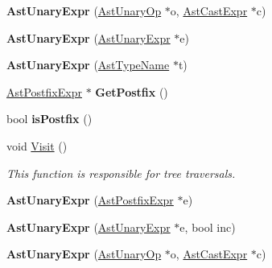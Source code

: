 \begin{DoxyCompactItemize}
\item 
\hypertarget{classAstUnaryExpr_ad71de2cd2c65b31e5f5f5fde4e75fc14}{{\bfseries Ast\-Unary\-Expr} (\hyperlink{classAstUnaryOp}{Ast\-Unary\-Op} $\ast$o, \hyperlink{classAstCastExpr}{Ast\-Cast\-Expr} $\ast$c)}\label{classAstUnaryExpr_ad71de2cd2c65b31e5f5f5fde4e75fc14}

\item 
\hypertarget{classAstUnaryExpr_a22b7c004d42c54c96b40de10cc90a07e}{{\bfseries Ast\-Unary\-Expr} (\hyperlink{classAstUnaryExpr}{Ast\-Unary\-Expr} $\ast$e)}\label{classAstUnaryExpr_a22b7c004d42c54c96b40de10cc90a07e}

\item 
\hypertarget{classAstUnaryExpr_a305b745cf1449c3d3dc4e74dcd768ef1}{{\bfseries Ast\-Unary\-Expr} (\hyperlink{classAstTypeName}{Ast\-Type\-Name} $\ast$t)}\label{classAstUnaryExpr_a305b745cf1449c3d3dc4e74dcd768ef1}

\item 
\hypertarget{classAstUnaryExpr_a0892bfd110770a877a6c654875beae05}{\hyperlink{classAstPostfixExpr}{Ast\-Postfix\-Expr} $\ast$ {\bfseries Get\-Postfix} ()}\label{classAstUnaryExpr_a0892bfd110770a877a6c654875beae05}

\item 
\hypertarget{classAstUnaryExpr_a8adfdc9b288dcb86e7ed6854601eef28}{bool {\bfseries is\-Postfix} ()}\label{classAstUnaryExpr_a8adfdc9b288dcb86e7ed6854601eef28}

\item 
void \hyperlink{classAstUnaryExpr_ae35427088d6f5c889e8e80573a3750fc}{Visit} ()
\begin{DoxyCompactList}\small\item\em This function is responsible for tree traversals. \end{DoxyCompactList}\item 
\hypertarget{classAstUnaryExpr_a7afc6e7c4cf309676aa701656c70453a}{{\bfseries Ast\-Unary\-Expr} (\hyperlink{classAstPostfixExpr}{Ast\-Postfix\-Expr} $\ast$e)}\label{classAstUnaryExpr_a7afc6e7c4cf309676aa701656c70453a}

\item 
\hypertarget{classAstUnaryExpr_a82859566c71d787e29263ff3ba013261}{{\bfseries Ast\-Unary\-Expr} (\hyperlink{classAstUnaryExpr}{Ast\-Unary\-Expr} $\ast$e, bool inc)}\label{classAstUnaryExpr_a82859566c71d787e29263ff3ba013261}

\item 
\hypertarget{classAstUnaryExpr_ad71de2cd2c65b31e5f5f5fde4e75fc14}{{\bfseries Ast\-Unary\-Expr} (\hyperlink{classAstUnaryOp}{Ast\-Unary\-Op} $\ast$o, \hyperlink{classAstCastExpr}{Ast\-Cast\-Expr} $\ast$c)}\label{classAstUnaryExpr_ad71de2cd2c65b31e5f5f5fde4e75fc14}


\end{DoxyCompactItemize}
